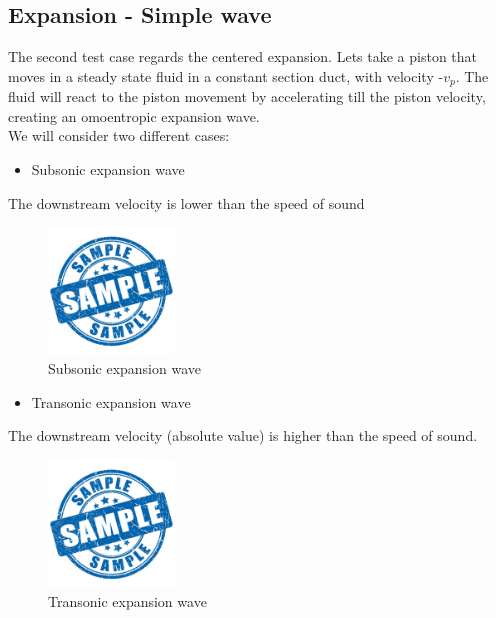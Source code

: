 \documentclass{report}
\begin{document}
\subsection*{Expansion - Simple wave}
The second test case regards the centered expansion. Lets take a piston that moves in a steady state fluid in a constant section duct,
with velocity -$v_p$. The fluid will react to the piston movement by accelerating till the piston velocity,
creating an omoentropic expansion wave.\\
We will consider two different cases:
\begin{itemize}
    \item Subsonic expansion wave
\end{itemize}
The downstream velocity is lower than the speed of sound
\begin{figure}[H]
    \centering
    \includegraphics[width=0.3\textwidth]{Images/sample.jpg}
    \caption{Subsonic expansion wave}
    \label{fig:subsonic_expansion_wave}
\end{figure}
\begin{itemize}
    \item Transonic expansion wave
\end{itemize}
The downstream velocity (absolute value) is higher than the speed of sound.\\
\begin{figure}[H]
    \centering
    \includegraphics[width=0.3\textwidth]{Images/sample.jpg}
    \caption{Transonic expansion wave}
    \label{fig:transonic_expansion_wave}
\end{figure}
\end{document}
